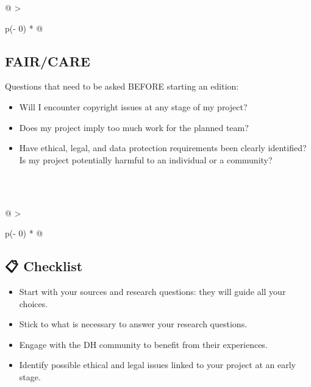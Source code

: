 \documentclass[
  letterpaper,
  DIV=11,
  numbers=noendperiod]{scrreprt}
\providecommand{\tightlist}{%
  \setlength{\itemsep}{0pt}\setlength{\parskip}{0pt}}\usepackage{longtable,booktabs,array}
\begin{document}
\begin{longtable}[]{@{}
  >{\raggedright\arraybackslash}p{(\columnwidth - 0\tabcolsep) * }@{}}
\toprule\noalign{}
\begin{minipage}[b]{\linewidth}\raggedright
\subsection*{\texorpdfstring{\textbf{FAIR/CARE}}{FAIR/CARE}}\label{faircare-ch02}

Questions that need to be asked BEFORE starting an edition:

\begin{itemize}
\tightlist
\item
  Will I encounter copyright issues at any stage of my project?
\end{itemize}

\begin{itemize}
\tightlist
\item
  Does my project imply too much work for the planned team?
\end{itemize}

\begin{itemize}
\tightlist
\item
  Have ethical, legal, and data protection requirements been clearly
  identified? Is my project potentially harmful to an individual or a
  community?
\end{itemize}
\end{minipage} \\
\midrule\noalign{}
\endhead
\bottomrule\noalign{}
\endlastfoot
 \\
\end{longtable}

\begin{longtable}[]{@{}
  >{\raggedright\arraybackslash}p{(\columnwidth - 0\tabcolsep) * }@{}}
\toprule\noalign{}
\begin{minipage}[b]{\linewidth}\raggedright
\subsection*{\texorpdfstring{\textbf{📋
Checklist}}{📋 Checklist}}\label{checklist-ch02}

\begin{itemize}
\item
  Start with your sources and research questions: they will guide all
  your choices.
\item
  Stick to what is necessary to answer your research questions.
\item
  Engage with the DH community to benefit from their experiences.
\item
  Identify possible ethical and legal issues linked to your project at
  an early stage.
\end{itemize}
\end{minipage} \\
\midrule\noalign{}
\endhead
\bottomrule\noalign{}
\endlastfoot
 \\
\end{longtable}
\end{document}
